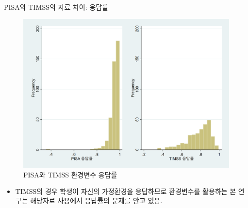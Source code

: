 \documentclass[handout, 10pt]{beamer}
\begin{document}
\begin{frame}{PISA와 TIMSS의 자료 차이: 응답률}
    \begin{figure}[htpb]
        \begin{center}
            \includegraphics[scale=0.08]{pic/pnt_response.png}
            \caption{PISA와 TIMSS 환경변수 응답률}
        \end{center}
    \end{figure}
    \begin{itemize}
        \item TIMSS의 경우 학생이 자신의 가정환경을 응답하므로 환경변수를 활용하는 본 연구는 해당자료 사용에서 응답률의 문제를 안고 있음.
    \end{itemize}
\end{frame}
\end{document}
